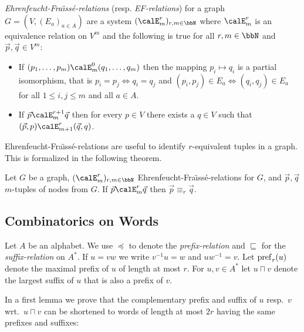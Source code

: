\emph{Ehrenfeucht-Fra\"\i{}ss\'e-relations} (resp. \emph{EF-relations}) for a graph $G = (V, (E_a)_{a\in A})$ are a system $(\calE^r_m)_{r,m\in\bbN}$ where  $\calE^r_m$ is an equivalence relation on $V^m$ and
the following is true for all $r,m\in\bbN$ and $\vec{p},\vec{q} \in V^m$:
\begin{itemize}
	\item If $(p_1,\ldots,p_m) \calE^0_m (q_1,\ldots,q_m)$ then the mapping $p_i \mapsto q_i$ is a partial isomorphism, that is $p_i= p_j \Leftrightarrow q_i=q_j$ and
	$(p_i,p_j)\in E_a \Leftrightarrow (q_i,q_j) \in E_a$ for all $1\leq i,j\leq m$ and all $a\in A$.
	\item If $\vec{p} \calE^{r+1}_m \vec{q}$ then for every $p\in V$ there exists a $q\in V$ such that $(\vec{p}, p) \calE^r_{m+1} (\vec{q}, q)$.
\end{itemize}

Ehrenfeucht-Fra\"\i{}ss\'e-relations are useful to identify $r$-equivalent tuples in a graph. This is formalized in the following theorem.
\begin{theorem}
	Let $G$ be a graph, $(\calE^r_m)_{r,m\in\bbN}$ Ehrenfeucht-Fra\"\i{}ss\'e-relations for $G$, and $\vec{p}, \vec{q}$ $m$-tuples of nodes from $G$. If $\vec{p} \calE^r_m \vec{q}$ then 
	$\vec{p} \equiv_r \vec{q}$.
\end{theorem} 

\subsection{Combinatorics on Words}
Let $A$ be an alphabet. We use $\preceq$ to denote the \emph{prefix-relation} and $\sqsubseteq$ for the \emph{suffix-relation} on $A^\ast$.  If $u= vw$ we write $v^{-1}u = w$ and
$uw^{-1} = v$.
Let $\operatorname{pref}_r(u)$ denote the maximal prefix of $u$ of length at most $r$. For $u,v\in A^\ast$ let $u \sqcap v$ denote the largest suffix of $u$ that is also a prefix of $v$.

In a first lemma we prove that the complementary prefix and suffix of $u$ resp.~$v$ wrt.~$u\sqcap v$ can be shortened to words of length at most $2r$ having the same prefixes and suffixes:

